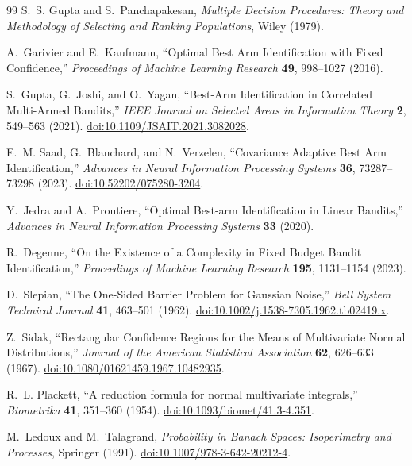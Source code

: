 \documentclass[a4paper,onecolumn,unpublished,nopdfoutputerror]{quantumarticle}
\theoremstyle{plain}
\theoremstyle{definition}
\newcommand{\1}{\mathbf{1}}
\begin{document}
\begin{thebibliography}{99}
S.~S. Gupta and S.~Panchapakesan,
\emph{Multiple Decision Procedures: Theory and Methodology of Selecting and Ranking Populations},
Wiley (1979).

A.~Garivier and E.~Kaufmann,
``Optimal Best Arm Identification with Fixed Confidence,''
\emph{Proceedings of Machine Learning Research} \textbf{49}, 998--1027 (2016).

S.~Gupta, G.~Joshi, and O.~Yagan,
``Best-Arm Identification in Correlated Multi-Armed Bandits,''
\emph{IEEE Journal on Selected Areas in Information Theory} \textbf{2}, 549--563 (2021). \href{https://doi.org/10.1109/JSAIT.2021.3082028}{doi:10.1109/JSAIT.2021.3082028}.

E.~M. Saad, G.~Blanchard, and N.~Verzelen,
``Covariance Adaptive Best Arm Identification,''
\emph{Advances in Neural Information Processing Systems} \textbf{36}, 73287--73298 (2023). \href{https://doi.org/10.52202/075280-3204}{doi:10.52202/075280-3204}.

Y.~Jedra and A.~Proutiere,
``Optimal Best-arm Identification in Linear Bandits,''
\emph{Advances in Neural Information Processing Systems} \textbf{33} (2020).

R.~Degenne,
``On the Existence of a Complexity in Fixed Budget Bandit Identification,''
\emph{Proceedings of Machine Learning Research} \textbf{195}, 1131--1154 (2023).

D.~Slepian,
``The One-Sided Barrier Problem for Gaussian Noise,''
\emph{Bell System Technical Journal} \textbf{41}, 463--501 (1962). \href{https://doi.org/10.1002/j.1538-7305.1962.tb02419.x}{doi:10.1002/j.1538-7305.1962.tb02419.x}.

Z.~Sidak,
``Rectangular Confidence Regions for the Means of Multivariate Normal Distributions,''
\emph{Journal of the American Statistical Association} \textbf{62}, 626--633 (1967). \href{https://doi.org/10.1080/01621459.1967.10482935}{doi:10.1080/01621459.1967.10482935}.

R.~L. Plackett,
``A reduction formula for normal multivariate integrals,''
\emph{Biometrika} \textbf{41}, 351--360 (1954). \href{https://doi.org/10.1093/biomet/41.3-4.351}{doi:10.1093/biomet/41.3-4.351}.

M.~Ledoux and M.~Talagrand,
\emph{Probability in Banach Spaces: Isoperimetry and Processes},
Springer (1991). \href{https://doi.org/10.1007/978-3-642-20212-4}{doi:10.1007/978-3-642-20212-4}.


\end{thebibliography}
\end{document}
